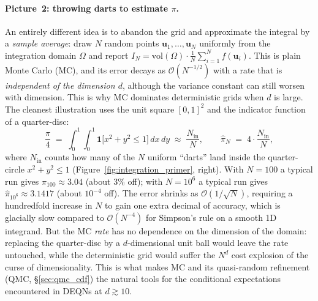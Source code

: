 \documentclass[11pt,a4paper]{report}
\begin{document}
\paragraph{Picture~2: throwing darts to estimate $\pi$.}  An entirely different idea is to abandon the grid and approximate the integral by a \emph{sample average}: draw $N$ random points $\bm{u}_1, \ldots, \bm{u}_N$ uniformly from the integration domain $\Omega$ and report $I_N = \mathrm{vol}(\Omega)\cdot \tfrac{1}{N}\sum_{i=1}^{N} f(\bm{u}_i)$.  This is plain Monte Carlo (MC), and its error decays as $\mathcal{O}(N^{-1/2})$ with a rate that is \emph{independent of the dimension $d$}, although the variance constant can still worsen with dimension.  This is why MC dominates deterministic grids when $d$ is large.  The cleanest illustration uses the unit square $[0,1]^2$ and the indicator function of a quarter-disc:
\begin{equation}
\frac{\pi}{4} \;=\; \int_0^1\!\!\int_0^1 \mathbf{1}\bigl[x^2 + y^2 \leq 1\bigr]\, dx\, dy
\;\approx\; \frac{N_{\mathrm{in}}}{N},
\qquad
\widehat{\pi}_N \;=\; 4\cdot \frac{N_{\mathrm{in}}}{N},
\label{eq:pi_mc}
\end{equation}
where $N_{\mathrm{in}}$ counts how many of the $N$ uniform ``darts'' land inside the quarter-circle $x^2+y^2 \leq 1$ (Figure~\ref{fig:integration_primer}, right).  With $N=100$ a typical run gives $\widehat{\pi}_{100} \approx 3.04$ (about 3\% off); with $N=10^6$ a typical run gives $\widehat{\pi}_{10^6} \approx 3.1417$ (about $10^{-4}$ off).  The error shrinks as $\mathcal{O}(1/\sqrt{N})$, requiring a hundredfold increase in $N$ to gain one extra decimal of accuracy, which is glacially slow compared to $\mathcal{O}(N^{-4})$ for Simpson's rule on a smooth 1D integrand.  But the MC \emph{rate} has no dependence on the dimension of the domain: replacing the quarter-disc by a $d$-dimensional unit ball would leave the rate untouched, while the deterministic grid would suffer the $N^d$ cost explosion of the curse of dimensionality.  This is what makes MC and its quasi-random refinement (QMC, \S\ref{sec:qmc_cdf}) the natural tools for the conditional expectations encountered in DEQNs at $d \gtrsim 10$.
\end{document}
